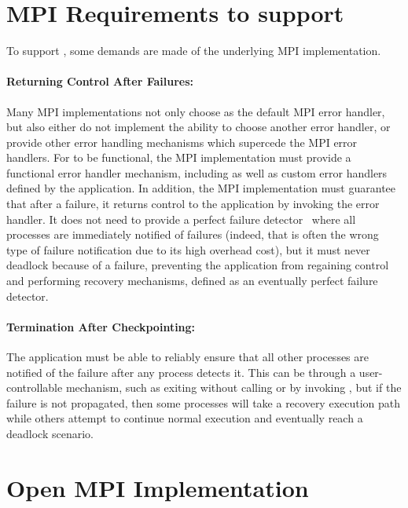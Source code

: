 \section{MPI Requirements to support \cof}\label{sect:cof:mpi}

To support \cof, some demands are made of the underlying MPI implementation.

\paragraph*{Returning Control After Failures:} Many MPI implementations not only
choose  as the default MPI error handler, but also
either do not implement the ability to choose another error handler, or provide
other error handling mechanisms which supercede the MPI error handlers. For \cof
to be functional, the MPI implementation must provide a functional error
handler mechanism, including  as well as custom
error handlers defined by the application. In addition, the MPI implementation
must guarantee that after a failure, it returns control to the application by
invoking the error handler. It does not need to provide a perfect failure
detector~\cite{Fischer:1985tt} where all processes are immediately notified of failures (indeed, that
is often the wrong type of failure notification due to its high overhead cost), 
but it must never deadlock because of a failure, preventing the application from 
regaining control and performing recovery mechanisms, defined as an eventually perfect failure detector.

\paragraph*{Termination After Checkpointing:} The application must be able to
reliably ensure that all other processes are notified of the failure after any
process detects it. This can be through a user-controllable mechanism, such as
exiting without calling  or by invoking
, but if the failure is not propagated, then some processes
will take a recovery execution path while others attempt to continue normal
execution and eventually reach a deadlock scenario.

\section{Open MPI Implementation}\label{sect:cof:ompi}

